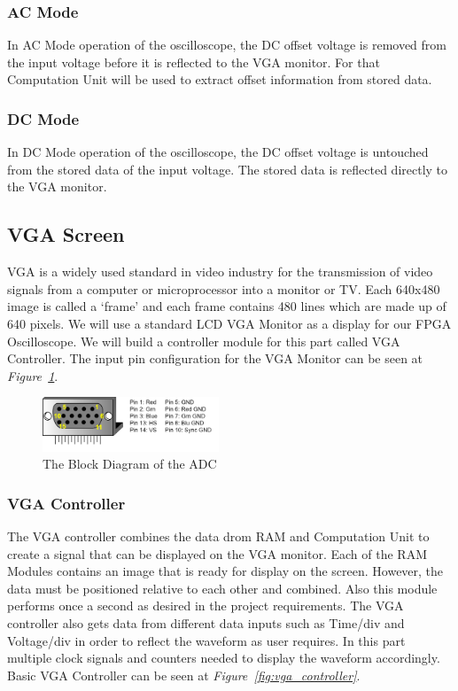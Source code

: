 \documentclass[paper]{IEEEtran}
\begin{document}
\subsubsection{AC Mode} \- \indent
	In AC Mode operation of the oscilloscope, the DC offset voltage is removed from the input voltage before it is reflected to the VGA monitor. For that Computation Unit will be used to extract offset information from stored data.

\subsubsection{DC Mode} \- \indent
	In DC Mode operation of the oscilloscope, the DC offset voltage is untouched from the stored data of the input voltage. The stored data is reflected directly to the VGA monitor. 
	

\subsection{VGA Screen} \- \indent
	VGA is a widely used standard in video industry for the transmission of video signals from a computer or microprocessor into a monitor or TV. Each 640x480 image is called a ‘frame’ and each frame contains 480 lines which are made up of 640 pixels. We will use a standard LCD VGA Monitor as a display for our FPGA Oscilloscope. We will build a controller module for this part called VGA Controller. The input pin configuration for the VGA Monitor can be seen at \textit{Figure~\ref{fig:vga_pins}}.
	
\begin{figure}[h!]
			\setlength{\unitlength}{\textwidth}
			\center 
			\includegraphics[width=0.47\textwidth]{vga_pins}
			\caption{\label{fig:vga_pins}The Block Diagram of the ADC}
\end{figure}

\subsubsection{VGA Controller} \- \indent

	The VGA controller combines the data drom RAM and Computation Unit to create a signal that can be displayed on the VGA monitor. Each of the RAM Modules contains an image that is ready for display on the screen. However, the data must be positioned relative to each other and combined. Also this module performs once a second as desired in the project requirements. The VGA controller also gets data from different data inputs such as Time/div and Voltage/div in order to reflect the waveform as user requires. In this part multiple clock signals and counters needed to display the waveform accordingly. Basic VGA Controller can be seen at \textit{Figure~\ref{fig:vga_controller}}\cite{b4}.
\end{document}
